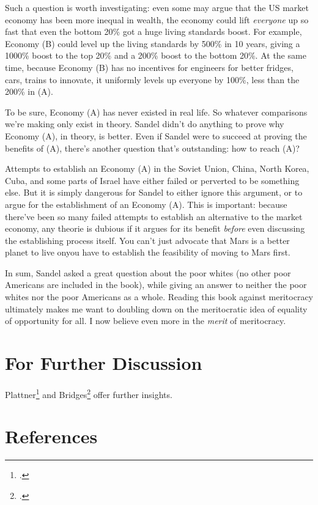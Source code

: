 \documentclass[12pt]{article}
\begin{document}
Such a question is worth investigating: even some may argue that the US market economy has been more inequal in wealth, the economy could lift \emph{everyone} up so fast that even the bottom 20\% got a huge living standards boost. For example, Economy (B) could level up the living standards by 500\% in 10 years, giving a 1000\% boost to the top 20\% and a 200\% boost to the bottom 20\%. At the same time, because Economy (B) has no incentives for engineers for better fridges, cars, trains to innovate, it uniformly levels up everyone by 100\%, less than the 200\% in (A). 

To be sure, Economy (A) has never existed in real life. So whatever comparisons we're making only exist in theory. Sandel didn't do anything to prove why Economy (A), in theory, is better. Even if Sandel were to succeed at proving the benefits of (A), there's another question that's outstanding: how to reach (A)?

Attempts to establish an Economy (A) in the Soviet Union, China, North Korea, Cuba, and some parts of Israel have either failed or perverted to be something else. But it is simply dangerous for Sandel to either ignore this argument, or to argue for the establishment of an Economy (A). This is important: because there've been so many failed attempts to establish an alternative to the market economy, any theorie is dubious if it argues for its benefit \emph{before} even discussing the establishing process itself. You can't just advocate that Mars is a better planet to live on\textemdash{}you have to establish the feasibility of moving to Mars first.

In sum, Sandel asked a great question about the poor whites (no other poor Americans are included in the book), while giving an answer to neither the poor whites nor the poor Americans as a whole. Reading this book against meritocracy ultimately makes me want to doubling down on the meritocratic idea of equality of opportunity for all. I now believe even more in the \emph{merit} of meritocracy.

\section{For Further Discussion}

Plattner\footcite{plattnerTyrannyMeritWhats2021} and Bridges\footcite{bridgesTYRANNYRACEBLINDNESS2021} offer further insights.

\section{References}

\printbibliography[heading=none]

\end{document}
